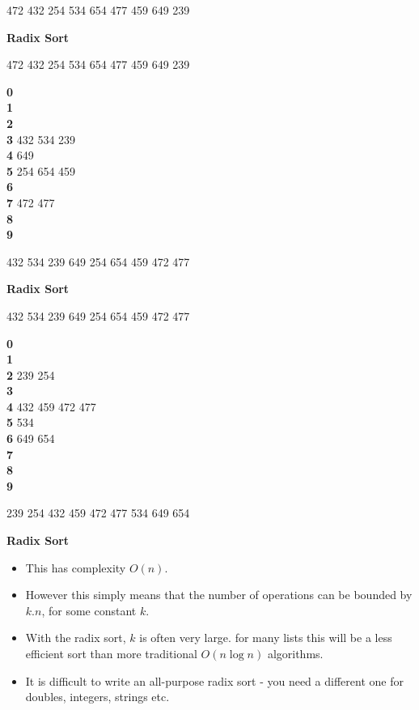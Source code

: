 \documentclass[a4,portraitt]{slides}
\begin{document}
{{472 432 254 534 654 477 459 649 239
}

\newpage
{\samepage
\begin{center}
{\Large{\bf Radix Sort}}
\end{center}

472 432 254 534 654 477 459 649 239

{\bf 0}\\
{\bf 1}\\
{\bf 2}\\
{\bf 3} 432 534 239\\
{\bf 4} 649\\
{\bf 5} 254 654 459\\
{\bf 6}\\
{\bf 7} 472 477\\
{\bf 8}\\
{\bf 9}
}

432 534 239 649 254 654 459 472 477

\newpage
{\samepage
\begin{center}
{\Large{\bf Radix Sort}}
\end{center}

432 534 239 649 254 654 459 472 477

{\bf 0}\\
{\bf 1}\\
{\bf 2} 239 254\\
{\bf 3}\\
{\bf 4} 432 459 472 477\\
{\bf 5} 534\\
{\bf 6} 649 654\\
{\bf 7}\\
{\bf 8}\\
{\bf 9}

239 254 432 459 472 477 534 649 654
}

\newpage
{\samepage
\begin{center}
{\Large{\bf Radix Sort}}
\end{center}
\begin{itemize}
\item This has complexity $O(n)$.
\item However this simply means that the number of operations
can be bounded by $k.n$, for some constant $k$.
\item With the radix sort, $k$
is often very large. for many lists this will be a less efficient
sort than more traditional $O(n \log n)$ algorithms.
\item It is difficult to write an all-purpose radix sort - you need
a different one for doubles, integers, strings etc.
\end{itemize}
}

}
\end{document}
